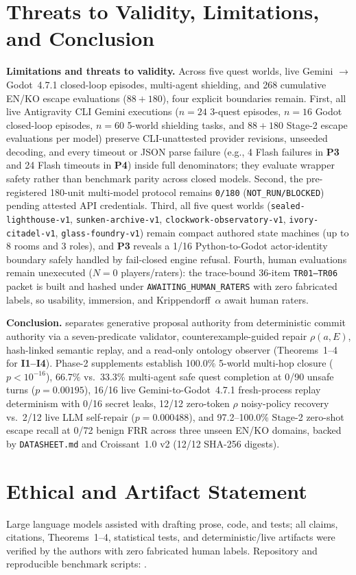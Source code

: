 \FloatBarrier
\section{Threats to Validity, Limitations, and Conclusion}\label{sec:conclusion}
\textbf{Limitations and threats to validity.} Across five quest worlds, live Gemini $\rightarrow$ Godot~4.7.1 closed-loop episodes, multi-agent shielding, and 268 cumulative EN/KO escape evaluations ($88 + 180$), four explicit boundaries remain. First, all live Antigravity CLI Gemini executions ($n{=}24$ 3-quest episodes, $n{=}16$ Godot closed-loop episodes, $n{=}60$ 5-world shielding tasks, and $88{+}180$ Stage-2 escape evaluations per model) preserve CLI-unattested provider revisions, unseeded decoding, and every timeout or JSON parse failure (e.g., 4 Flash failures in \textbf{P3} and 24 Flash timeouts in \textbf{P4}) inside full denominators; they evaluate wrapper safety rather than benchmark parity across closed models. Second, the pre-registered 180-unit multi-model protocol remains \texttt{0/180} (\texttt{NOT\_RUN/BLOCKED}) pending attested API credentials. Third, all five quest worlds (\texttt{sealed-\allowbreak lighthouse-\allowbreak v1}, \texttt{sunken-\allowbreak archive-\allowbreak v1}, \texttt{clockwork-\allowbreak observatory-\allowbreak v1}, \texttt{ivory-\allowbreak citadel-\allowbreak v1}, \texttt{glass-\allowbreak foundry-\allowbreak v1}) remain compact authored state machines (up to 8 rooms and 3 roles), and \textbf{P3} reveals a 1/16 Python-to-Godot actor-identity boundary safely handled by fail-closed engine refusal. Fourth, human evaluations remain unexecuted ($N{=}0$ players/raters): the trace-bound 36-item \texttt{TR01--TR06} packet is built and hashed under \texttt{AWAITING\_}\allowbreak\texttt{HUMAN\_}\allowbreak\texttt{RATERS} with zero fabricated labels, so usability, immersion, and Krippendorff~$\alpha$ await human raters.

\textbf{Conclusion.} \system{} separates generative proposal authority from deterministic commit authority via a seven-predicate validator, counterexample-guided repair $\rho(a,E)$, hash-linked semantic replay, and a read-only ontology observer (Theorems~1--4 for \textbf{I1--I4}). Phase-2 supplements establish 100.0\% 5-world multi-hop closure ($p{<}10^{-16}$), 66.7\% vs.\ 33.3\% multi-agent safe quest completion at 0/90 unsafe turns ($p{=}0.00195$), 16/16 live Gemini-to-Godot~4.7.1 fresh-process replay determinism with 0/16 secret leaks, 12/12 zero-token $\rho$ noisy-policy recovery vs.\ 2/12 live LLM self-repair ($p{=}0.000488$), and 97.2--100.0\% Stage-2 zero-shot escape recall at 0/72 benign FRR across three unseen EN/KO domains, backed by \texttt{DATASHEET.md} and Croissant~1.0 v2 (12/12 SHA-256 digests).

\section*{Ethical and Artifact Statement}
Large language models assisted with drafting prose, code, and tests; all claims, citations, Theorems~1--4, statistical tests, and deterministic/live artifacts were verified by the authors with zero fabricated human labels. Repository and reproducible benchmark scripts: \RepoURL.

